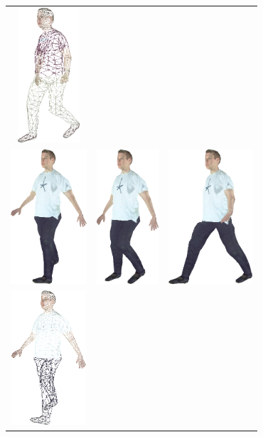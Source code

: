 \begin{figure}
\begin{center}
\begin{tabular}{ccc}
\includegraphics[height=5cm]{../images/james_wire3} \\
\includegraphics[height=5cm]{../images/warren_texture1} &
\includegraphics[height=5cm]{../images/warren_texture2} &
\includegraphics[height=5cm]{../images/warren_texture3} \\
\includegraphics[height=5cm]{../images/warren_wire1} &

\end{tabular}
\end{center}
\end{figure}
